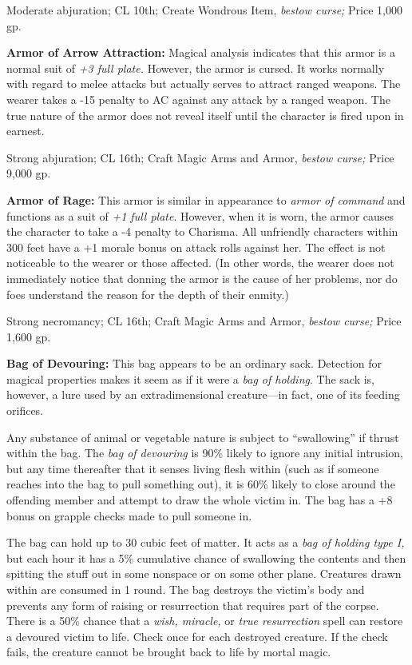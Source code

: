 \documentclass{article}
\begin{document}
Moderate abjuration; CL 10th; Create Wondrous Item, \textit{bestow curse; }Price 
1,000 gp.

\textbf{Armor of Arrow Attraction:} Magical analysis indicates that this armor 
is a normal suit of \textit{+3 full plate. }However, the armor is cursed. It works 
normally with regard to melee attacks but actually serves to attract ranged weapons. 
The wearer takes a -15 penalty to AC against any attack by a ranged weapon. The 
true nature of the armor does not reveal itself until the character is fired upon 
in earnest.

Strong abjuration; CL 16th; Craft Magic Arms and Armor, \textit{bestow curse; }Price 
9,000 gp.

\textbf{Armor of Rage: }This armor is similar in appearance to \textit{armor of 
command }and functions as a suit of \textit{+1 full plate}. However, when it is 
worn, the armor causes the character to take a -4 penalty to Charisma. All unfriendly 
characters within 300 feet have a +1 morale bonus on attack rolls against her. 
The effect is not noticeable to the wearer or those affected. (In other words, 
the wearer does not immediately notice that donning the armor is the cause of her 
problems, nor do foes understand the reason for the depth of their enmity.)

Strong necromancy; CL 16th; Craft Magic Arms and Armor, \textit{bestow curse; }Price 
1,600 gp.

\textbf{Bag of Devouring: }This bag appears to be an ordinary sack. Detection for 
magical properties makes it seem as if it were a \textit{bag of holding}. The sack 
is, however, a lure used by an extradimensional creature---in fact, one of its 
feeding orifices.

Any substance of animal or vegetable nature is subject to ``swallowing'' if thrust 
within the bag. The \textit{bag of devouring }is 90\% likely to ignore any initial 
intrusion, but any time thereafter that it senses living flesh within (such as 
if someone reaches into the bag to pull something out), it is 60\% likely to close 
around the offending member and attempt to draw the whole victim in. The bag has 
a +8 bonus on grapple checks made to pull someone in.

The bag can hold up to 30 cubic feet of matter. It acts as a \textit{bag of holding 
type I, }but each hour it has a 5\% cumulative chance of swallowing the contents 
and then spitting the stuff out in some nonspace or on some other plane. Creatures 
drawn within are consumed in 1 round. The bag destroys the victim's body and prevents 
any form of raising or resurrection that requires part of the corpse. There is 
a 50\% chance that a \textit{wish, miracle, }or \textit{true resurrection }spell 
can restore a devoured victim to life. Check once for each destroyed creature. 
If the check fails, the creature cannot be brought back to life by mortal magic.
\end{document}
